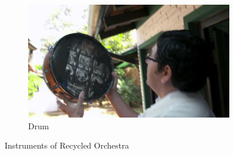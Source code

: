 \begin{itemize}
\begin{figure}
    \begin{subfigure}[b]{0.3\textwidth}
        \includegraphics[width=\textwidth]{graphics/landfill_harmonic_drum2.png}
        \caption{Drum}
        \label{fig:mouse}
    \end{subfigure}
    \caption{Instruments of Recycled Orchestra}\label{fig:animals}
\end{figure}





\end{itemize}
